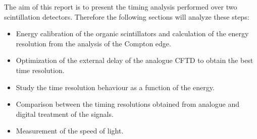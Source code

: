 The aim of this report is to present the timing analysis performed over two scintillation detectors. Therefore the  following sections will analyze these steps:
\begin{itemize}
\item Energy calibration of the organic scintillators and
calculation of the energy resolution from the analysis of
the Compton edge.
\item Optimization of the external delay of the analogue
CFTD to obtain the best time resolution.
\item Study the time resolution behaviour as a function of the
energy.
\item Comparison between the timing resolutions obtained
from analogue and digital treatment of the signals.
\item Measurement of the speed of light. 
\end{itemize}